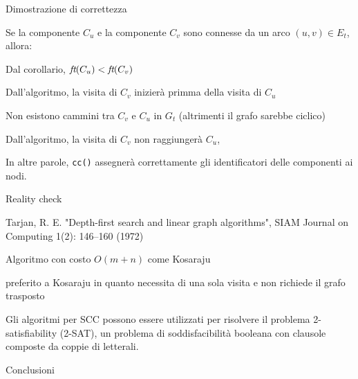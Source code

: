 \begin{frame}{Dimostrazione di correttezza}
    
\BIL
\item Se la componente $C_u$ e la componente $C_v$ sono connesse da un arco 
$(u,v) \in E_t$, allora:
\BI
\item Dal corollario, $\textit{ft}(C_u) < \textit{ft}(C_v)$
\item Dall'algoritmo, la visita di $C_v$ inizierà primma della visita di $C_u$
\EI
\item Non esistono cammini tra $C_v$ e $C_u$ in $G_t$
(altrimenti il grafo sarebbe ciclico)
\BI
\item Dall'algoritmo, la visita di $C_v$ non raggiungerà $C_u$,
\EI
\EIL

In altre parole, \texttt{cc()} assegnerà correttamente gli identificatori delle
componenti ai nodi.
\end{frame}    

\begin{frame}{Reality check}

\vspace{-6pt}
\begin{myboxtitle}
\BIL
\item Tarjan, R. E. "Depth-first search and linear graph algorithms", SIAM Journal on Computing 1(2): 146–160 (1972)
\item Algoritmo con costo $O(m+n)$ come Kosaraju
\item \EE preferito a Kosaraju in quanto necessita di una sola visita e non richiede il grafo trasposto
\EIL
\end{myboxtitle}

\begin{myboxtitle}[Applicazioni]
Gli algoritmi per SCC possono essere utilizzati per risolvere il problema
\alert{2-satisfiability} (\alert{2-SAT}), un problema di soddisfacibilità booleana con 
clausole composte da coppie di letterali.
\end{myboxtitle}

\end{frame}

\begin{frame}{Conclusioni}

\vspace{-6pt}

\end{frame}


